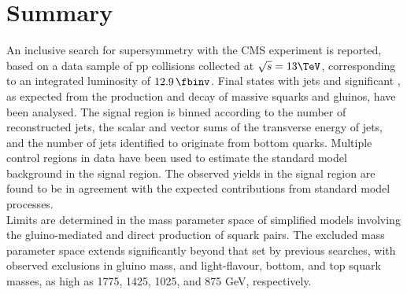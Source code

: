 \section{Summary}
\label{sec:summary}

An inclusive search for supersymmetry with the CMS experiment is
reported, based on a data sample of pp collisions collected at
$\sqrt{s} = 13\TeV$, corresponding to an integrated luminosity of $12.9\, \fbinv$. 
Final states with jets and significant \met, as
expected from the production and decay of massive squarks and gluinos,
have been analysed.  The signal region is binned according to the
number of reconstructed jets, the scalar and vector sums of the
transverse energy of jets, and the number of jets identified to
originate from bottom quarks. 
Multiple control regions in data have been used to estimate the standard model background in 
the signal region. 
The observed yields in the signal region are found to be in agreement with
the expected contributions from standard model processes. \\
Limits are determined in the mass parameter space of simplified models 
involving the gluino-mediated and direct production of squark pairs. 
The excluded mass parameter space extends significantly beyond that 
set by previous searches, with observed exclusions in gluino mass, 
and light-flavour, bottom, and top squark masses, as high as 1775, 
1425, 1025, and 875 GeV, respectively.

